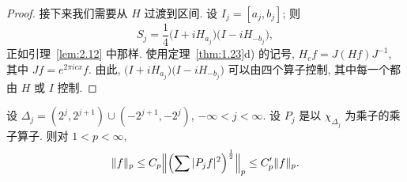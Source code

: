 \begin{proof}
接下来我们需要从 $H$ 过渡到区间. 设 $I_{j}=[a_{j},b_{j}]$; 则
\[
S_{j}=\frac{1}{4}\bigl(I+iH_{a_{j}}\bigr)\bigl(I-iH_{-b_{j}}\bigr),
\]
正如引理~\ref{lem:2.12} 中那样. 使用定理~\ref{thm:1.23}d) 的记号, $H_{c}f=J(Hf)J^{-1}$, 其中 $Jf=e^{2\pi icx}f$. 由此, $\bigl(I+iH_{a_{j}}\bigr)\bigl(I-iH_{-b_{j}}\bigr)$ 可以由四个算子控制, 其中每一个都由 $H$ 或 $I$ 控制.
\end{proof}

\begin{theorem}\label{thm:4.13}
设 $\Delta_j=(2^j,2^{j+1})\cup(-2^{j+1},-2^j)$, $-\infty<j<\infty$. 设 $P_j$ 是以 $\chi_{\Delta_j}$ 为乘子的乘子算子. 则对 $1<p<\infty$,
\[
\|f\|_{p}\leq C_{p}\Bigl\|\Bigl(\sum|P_{j}f|^{2}\Bigr)^{\frac{1}{2}}\Bigr\|_{p}\leq C_{p}'\|f\|_{p}.
\]
\end{theorem}

